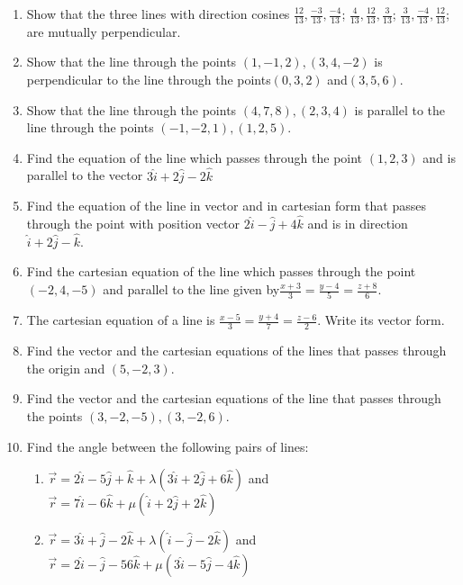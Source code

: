 \begin{enumerate}[label=\thesection.\arabic*,ref=\thesection.\theenumi]
\item  Show that the three lines with direction cosines
$\frac{12}{13},\frac{-3}{13},\frac{-4}{13}$; $\frac{4}{13},\frac{12}{13},\frac{3}{13}$; $\frac{3}{13},\frac{-4}{13},\frac{12}{13}$; are mutually perpendicular.\\
\item  Show that the line through the points $(1,-1,2),(3,4,-2 )$ is perpendicular to the line through the points$(0,3,2)$ and$(3,5,6)$.\\
\item Show that the line through the points $(4,7,8),(2,3,4)$ is parallel to the line through the points $(-1,-2,1),(1,2,5)$.\\
\item  Find the equation of the line which passes through the point $(1,2,3)$ and is parallel to the vector $3\hat{i}+2\hat{j}-2\hat{k}$\\
\item  Find the equation of the line in vector and in cartesian form that passes through the point with position vector $2\hat{i}-\hat{j}+4\hat{k}$ and is in direction $\hat{i}+2\hat{j}-\hat{k}$.\\
\item Find the cartesian equation of the line which passes through the point $(-2,4,-5)$ and parallel to the line given by$ \frac{x+3}{3}=\frac{y-4}{5}=\frac{z+8}{6}$.\\
\item The cartesian equation of a line is $ \frac{x-5}{3}=\frac{y+4}{7}=\frac{z-6}{2}$. Write its vector form.\\
\item Find the vector and the cartesian equations of the lines that passes through the origin and $(5,-2,3)$.\\
\item Find the vector and the cartesian equations of the line that passes through the points $(3,-2,-5),(3,-2,6)$.\\
\item  Find the angle between the following pairs of lines:
\begin{enumerate}
\item  $\overrightarrow{r}=2\hat{i}-5\hat{j}+\hat{k}+\lambda(3\hat{i}+2\hat{j}+6\hat{k})$ and\\ $\overrightarrow{r}=7\hat{i}-6\hat{k}+\mu(\hat{i}+2\hat{j}+2\hat{k})$
\item   $\overrightarrow{r}=3\hat{i}+\hat{j}-2\hat{k}+\lambda(\hat{i}-\hat{j}-2\hat{k})$ and\\ $\overrightarrow{r}=2\hat{i}-\hat{j}-56\hat{k}+\mu(3\hat{i}-5\hat{j}-4\hat{k})$ 

\end{enumerate}
\end{enumerate}
